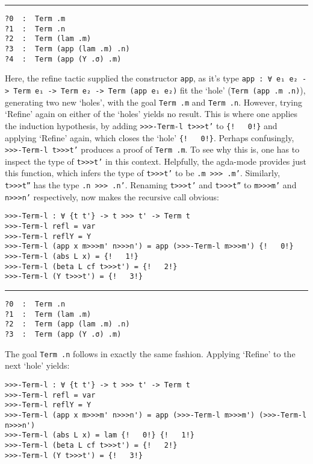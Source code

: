 \documentclass[a4paper, 12pt, twoside]{style/ociamthesis}
\theoremstyle{plain}
\theoremstyle{definition}
\newtheorem{Example}{Example}[chapter]
\theoremstyle{remark}
\renewenvironment{Example}{\begin{OldExample}\begin{mdframed}[style=example, linecolor=yellow]}{\end{mdframed}\end{OldExample}}
\begin{document}
\begin{Example}
\noindent\rule{8cm}{0.4pt}

\begin{verbatim}
?0  :  Term .m
?1  :  Term .n
?2  :  Term (lam .m)
?3  :  Term (app (lam .m) .n)
?4  :  Term (app (Y .σ) .m)
\end{verbatim}

Here, the refine tactic supplied the constructor \texttt{app}, as it's
type \texttt{app : ∀ {e₁ e₂} -> Term e₁ -> Term e₂ -> Term (app e₁ e₂)}
fit the `hole' (\texttt{Term (app .m .n)}), generating two new `holes',
with the goal \texttt{Term .m} and \texttt{Term .n}. However, trying
`Refine' again on either of the `holes' yields no result. This is where
one applies the induction hypothesis, by adding
\texttt{>>>-Term-l t>>>t'} to \texttt{\{!\ \ \ 0!\}} and applying
`Refine' again, which closes the `hole' \texttt{\{!\ \ \ 0!\}}. Perhaps
confusingly, \texttt{>>>-Term-l t>>>t'} produces a proof of
\texttt{Term .m}. To see why this is, one has to inspect the type of
\texttt{t>>>t'} in this context. Helpfully, the agda-mode provides just
this function, which infers the type of \texttt{t>>>t'} to be
\texttt{.m >>> .m'}. Similarly, \texttt{t>>>t''} has the type
\texttt{.n >>> .n'}. Renaming \texttt{t>>>t'} and \texttt{t>>>t''} to
\texttt{m>>>m'} and \texttt{n>>>n'} respectively, now makes the
recursive call obvious:

\begin{verbatim}
>>>-Term-l : ∀ {t t'} -> t >>> t' -> Term t
>>>-Term-l refl = var
>>>-Term-l reflY = Y
>>>-Term-l (app x m>>>m' n>>>n') = app (>>>-Term-l m>>>m') {!   0!}
>>>-Term-l (abs L x) = {!   1!}
>>>-Term-l (beta L cf t>>>t') = {!   2!}
>>>-Term-l (Y t>>>t') = {!   3!}
\end{verbatim}

\noindent\rule{8cm}{0.4pt}

\begin{verbatim}
?0  :  Term .n
?1  :  Term (lam .m)
?2  :  Term (app (lam .m) .n)
?3  :  Term (app (Y .σ) .m)
\end{verbatim}

The goal \texttt{Term .n} follows in exactly the same fashion. Applying
`Refine' to the next `hole' yields:

\begin{verbatim}
>>>-Term-l : ∀ {t t'} -> t >>> t' -> Term t
>>>-Term-l refl = var
>>>-Term-l reflY = Y
>>>-Term-l (app x m>>>m' n>>>n') = app (>>>-Term-l m>>>m') (>>>-Term-l n>>>n')
>>>-Term-l (abs L x) = lam {!   0!} {!   1!}
>>>-Term-l (beta L cf t>>>t') = {!   2!}
>>>-Term-l (Y t>>>t') = {!   3!}
\end{verbatim}


\end{Example}
\end{document}
